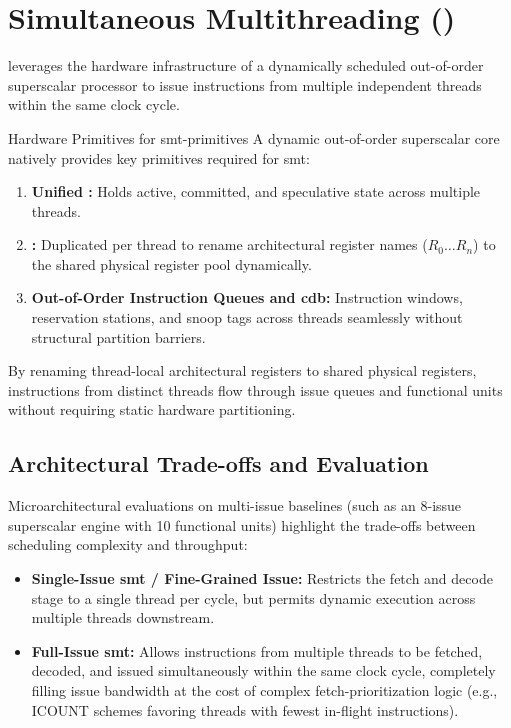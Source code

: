 \section{Simultaneous Multithreading ()}
\label{sec:smt}

 leverages the hardware infrastructure of a dynamically scheduled out-of-order superscalar processor to issue instructions from multiple independent threads within the same clock cycle.

\begin{concept}{Hardware Primitives for }{smt-primitives}
    A dynamic out-of-order superscalar core natively provides key primitives required for \gls{smt}:
    \begin{enumerate}
        \item \textbf{Unified :} Holds active, committed, and speculative state across multiple threads.
        \item \textbf{:} Duplicated per thread to rename architectural register names ($R_0 \dots R_n$) to the shared physical register pool dynamically.
        \item \textbf{Out-of-Order Instruction Queues and \gls{cdb}:} Instruction windows, reservation stations, and  snoop tags across threads seamlessly without structural partition barriers.
    \end{enumerate}
\end{concept}

By renaming thread-local architectural registers to shared physical registers, instructions from distinct threads flow through issue queues and functional units without requiring static hardware partitioning.

\subsection{ Architectural Trade-offs and Evaluation}

Microarchitectural evaluations on multi-issue baselines (such as an 8-issue superscalar engine with 10 functional units) highlight the trade-offs between scheduling complexity and throughput:

\begin{itemize}
    \item \textbf{Single-Issue \gls{smt} / Fine-Grained Issue:} Restricts the fetch and decode stage to a single thread per cycle, but permits dynamic execution across multiple threads downstream.
    \item \textbf{Full-Issue \gls{smt}:} Allows instructions from multiple threads to be fetched, decoded, and issued simultaneously within the same clock cycle, completely filling issue bandwidth at the cost of complex fetch-prioritization logic (e.g., \textsf{ICOUNT} schemes favoring threads with fewest in-flight instructions).
\end{itemize}

